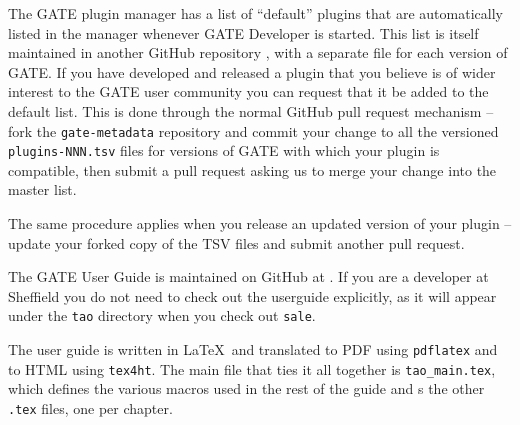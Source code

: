 
The GATE plugin manager has a list of ``default'' plugins that are
automatically listed in the manager whenever GATE Developer is started.  This
list is itself maintained in another GitHub repository
, with a separate file
for each version of GATE.  If you have developed and released a plugin that you
believe is of wider interest to the GATE user community you can request that it
be added to the default list.  This is done through the normal GitHub pull
request mechanism -- fork the \verb!gate-metadata! repository and commit your
change to all the versioned \verb!plugins-NNN.tsv! files for versions of GATE
with which your plugin is compatible, then submit a pull request asking us to
merge your change into the master list.

The same procedure applies when you release an updated version of your plugin
-- update your forked copy of the TSV files and submit another pull request.


The GATE User Guide is maintained on GitHub at
.  If you are a developer at
Sheffield you do not need to check out
the userguide explicitly, as it will appear under the \texttt{tao} directory
when you check out \texttt{sale}.

The user guide is written in \LaTeX\ and translated to PDF using
\texttt{pdflatex} and to HTML using \texttt{tex4ht}.  The main file that ties
it all together is \verb|tao_main.tex|, which defines the various macros used
in the rest of the guide and \verb||s the other \texttt{.tex} files, one
per chapter.


